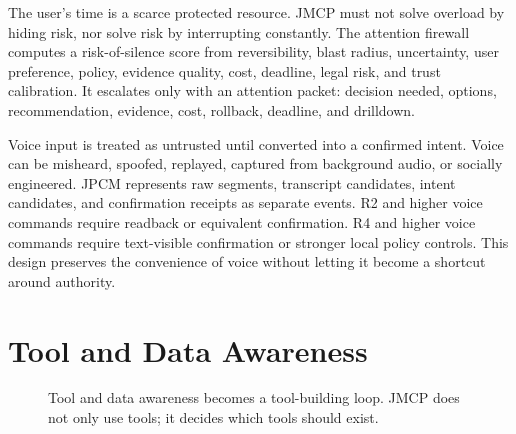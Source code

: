 \documentclass[journal,onecolumn]{IEEEtran}
\begin{document}
The user's time is a scarce protected resource. JMCP must not solve overload by hiding risk, nor solve risk by interrupting constantly. The attention firewall computes a risk-of-silence score from reversibility, blast radius, uncertainty, user preference, policy, evidence quality, cost, deadline, legal risk, and trust calibration. It escalates only with an attention packet: decision needed, options, recommendation, evidence, cost, rollback, deadline, and drilldown.

Voice input is treated as untrusted until converted into a confirmed intent. Voice can be misheard, spoofed, replayed, captured from background audio, or socially engineered. JPCM represents raw segments, transcript candidates, intent candidates, and confirmation receipts as separate events. R2 and higher voice commands require readback or equivalent confirmation. R4 and higher voice commands require text-visible confirmation or stronger local policy controls. This design preserves the convenience of voice without letting it become a shortcut around authority.

\section{Tool and Data Awareness}
\begin{figure}[t]
\centering
{}
\caption{Tool and data awareness becomes a tool-building loop. JMCP does not only use tools; it decides which tools should exist.}
\end{figure}
\end{document}
